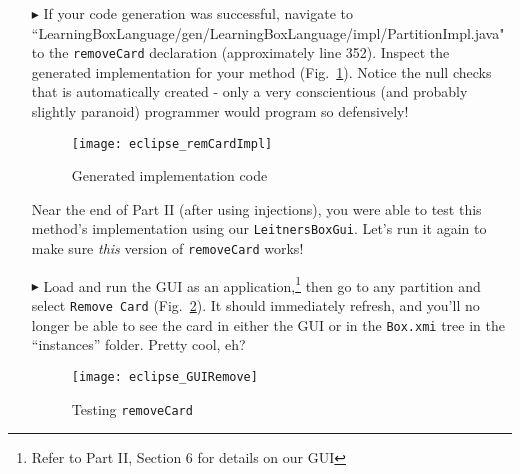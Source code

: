 \begin{itemize}

\item[$\blacktriangleright$] If your code generation was successful, navigate to
``Learning\-Box\-Language/\-gen/\-Learning\-Box\-Language/\-impl/\-Partition\-Impl.java" to the \texttt{\-remove\-Card} declaration (approximately line 352).
Inspect the generated implementation for your method (Fig.~\ref{fig:remCardImpl}). Notice the null checks that is automatically created - only a very
conscientious (and probably slightly paranoid) programmer would program so defensively!

\vspace{0.5cm}

\begin{figure}[htp]
\begin{center}
  \texttt{[image: eclipse\_remCardImpl]}
  \caption{Generated implementation code}
  \label{fig:remCardImpl}
\end{center}
\end{figure}

\newpage

Near the end of Part II (after using injections), you were able to test this method's implementation using our \texttt{LeitnersBoxGui}. Let's run it again to
make sure \emph{this} version of \texttt{removeCard} works!

\item[$\blacktriangleright$] Load and run the GUI as an application,\footnote{Refer to Part II, Section 6 for details on our GUI} then go to any partition and
select \texttt{Remove Card} (Fig.~\ref{fig:GUIRemCard}).
It should immediately refresh, and you'll no longer be able to see the card in either the GUI or in the \texttt{Box.xmi} tree in the ``instances'' folder.
Pretty cool, eh?

\vspace{1cm}

\begin{figure}[htp]
\begin{center}
  \texttt{[image: eclipse\_GUIRemove]}
  \caption{Testing \texttt{removeCard}}
  \label{fig:GUIRemCard}
\end{center}
\end{figure}

\end{itemize}